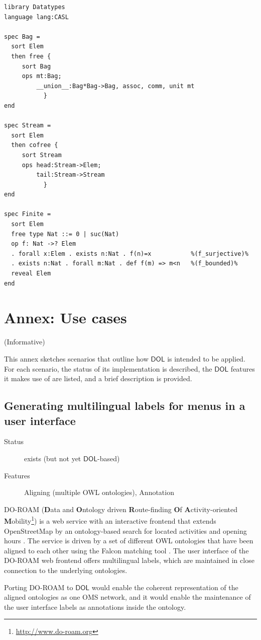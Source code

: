 \documentclass[10pt,fleqn,final]{scrreprt}
\newcommand*{\DOL}{\ensuremath{\mathsf{DOL}}\xspace}
\newcommand{\informative}[0]{{\begin{center}{\Large{(Informative})}\end{center}} \bigskip}
\newcommand{\sclause}[1]{\section{#1}}
\newcommand{\infannex}[1]{ \chapter{Annex: #1}  \informative }
\begin{document}
\begin{lstlisting}[basicstyle=\ttfamily,language=dolText,morekeywords={props,ObjectProperty,Class,DisjointUnionOf,SubClassOf,Characteristics,Transitive,Asymmetric,SubPropertyOf,DisjointClasses,EquivalentTo,inverse,only,forall,iff,if,or,exists,sort,ops,in,approximate,extract,free,cofree,spec},escapechar=@,mathescape]
%prefix( lang:  <http://purl.net/DOL/languages/> )%
library Datatypes
language lang:CASL

spec Bag =
  sort Elem
  then free {
     sort Bag
     ops mt:Bag;
         __union__:Bag*Bag->Bag, assoc, comm, unit mt
           }
end

spec Stream =
  sort Elem
  then cofree {
     sort Stream
     ops head:Stream->Elem;
         tail:Stream->Stream
           }
end

spec Finite =
  sort Elem
  free type Nat ::= 0 | suc(Nat)
  op f: Nat ->? Elem
  . forall x:Elem . exists n:Nat . f(n)=x           %(f_surjective)%
  . exists n:Nat . forall m:Nat . def f(m) => m<n   %(f_bounded)%
  reveal Elem
end

\end{lstlisting}

\infannex{Use cases}\label{a:use-cases}

This annex sketches scenarios that outline how \DOL is intended to be applied.  For each scenario,  the status of its implementation is described, the \DOL features it makes use of are listed, and a brief description is provided.

\newenvironment{usecase}[3]{\sclause{#1}%
\begin{description}
\item[Status] #2
\item[Features] #3
\end{description}
}{}
\begin{usecase}{Generating multilingual labels for menus in a user interface}{exists (but not yet \DOL-based)}{Aligning (multiple OWL ontologies), Annotation}
  DO-ROAM (\textbf{D}ata and \textbf{O}ntology driven \textbf{R}oute-finding \textbf{O}f \textbf{A}ctivity-oriented \textbf{M}obility\footnote{\url{http://www.do-roam.org}}) is a web service with an interactive frontend that extends OpenStreetMap by an ontology-based search for located activities and opening hours \cite{do-roam}.  The service is driven by a set of different OWL ontologies that have been aligned to each other using the Falcon matching tool \cite{HuQu-08}.  The user interface of the DO-ROAM web frontend offers multilingual labels, which are maintained in close connection to the underlying ontologies.

  Porting DO-ROAM to \DOL would enable the coherent representation of the aligned ontologies as one OMS network, and it would enable  the maintenance of the user interface labels as annotations inside the ontology.
\end{usecase}
\end{document}
